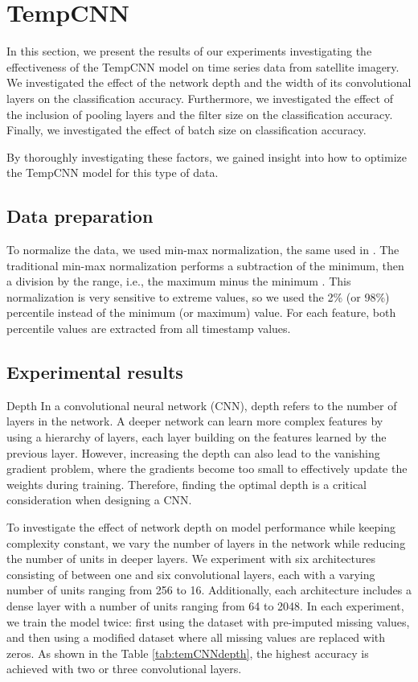\section{TempCNN}

In this section, we present the results of our experiments investigating the effectiveness of the TempCNN model on time series data from satellite imagery.
We investigated the effect of the network depth and the width of its convolutional layers on the classification accuracy. 
Furthermore, we investigated the effect of the inclusion of pooling layers and the filter size on the classification accuracy. 
Finally, we investigated the effect of batch size on classification accuracy. 

By thoroughly investigating these factors, we gained insight into how to optimize the TempCNN model for this type of data.

\subsection{Data preparation}

To normalize the data, we used min-max normalization, the same used in \cite{tempCNN}.
The traditional min-max normalization performs a subtraction of the minimum, then a division by the range, i.e., the maximum minus the minimum \cite{han2011data}.
This normalization is very sensitive to extreme values, so we used the 2\% (or 98\%) percentile instead of the minimum (or maximum) value. 
For each feature, both percentile values are extracted from all timestamp values.

\subsection{Experimental results}


\begin{paragraph}{Depth}
  In a convolutional neural network (CNN), depth refers to the number of layers in the network.
  A deeper network can learn more complex features by using a hierarchy of layers, each layer building on the features learned by the previous layer.
  However, increasing the depth can also lead to the vanishing gradient problem, where the gradients become too small to effectively update the weights during training.
  Therefore, finding the optimal depth is a critical consideration when designing a CNN.
\end{paragraph}

To investigate the effect of network depth on model performance while keeping complexity constant, we vary the number of layers in the network while reducing the number of units in deeper layers.
We experiment with six architectures consisting of between one and six convolutional layers, each with a varying number of units ranging from 256 to 16.
Additionally, each architecture includes a dense layer with a number of units ranging from 64 to 2048. 
In each experiment, we train the model twice: first using the dataset with pre-imputed missing values, and then using a modified dataset where all missing values are replaced with zeros.
As shown in the Table \ref{tab:temCNNdepth}, the highest accuracy is achieved with two or three convolutional layers.

